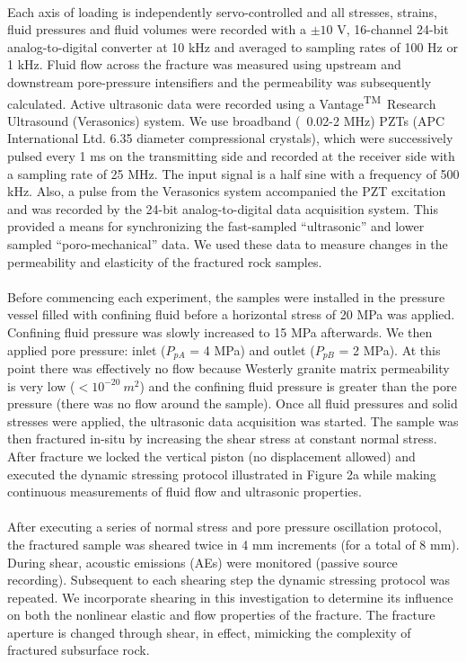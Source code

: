 \documentclass[letterpaper,10pt]{article}
\begin{document}
\paragraph{} Each axis of loading is independently servo-controlled and all stresses, strains, fluid pressures and fluid volumes were recorded with a $\pm10$ V, 16-channel 24-bit analog-to-digital converter at 10 kHz and averaged to sampling rates of 100 Hz or 1 kHz. Fluid flow across the fracture was measured using upstream and downstream pore-pressure intensifiers and the permeability was subsequently calculated. Active ultrasonic data were recorded using a Vantage\textsuperscript{TM}\ Research Ultrasound (Verasonics) system. We use broadband (~0.02-2 MHz) PZTs (APC International Ltd. 6.35 diameter compressional crystals), which were successively pulsed every 1 ms on the transmitting side and recorded at the receiver side with a sampling rate of 25 MHz. The input signal is a half sine with a frequency of 500 kHz. Also, a pulse from the Verasonics system accompanied the PZT excitation and was recorded by the 24-bit analog-to-digital data acquisition system. This provided a means for synchronizing the fast-sampled “ultrasonic” and lower sampled “poro-mechanical” data. We used these data to measure changes in the permeability and elasticity of the fractured rock samples.

\paragraph{} Before commencing each experiment, the samples were installed in the pressure vessel filled with confining fluid before a horizontal stress of 20 MPa was applied. Confining fluid pressure was slowly increased to 15 MPa afterwards. We then applied pore pressure: inlet ($P_{pA}$ = 4 MPa) and outlet ($P_{pB}$ = 2 MPa). At this point there was effectively no flow because Westerly granite matrix permeability is very low ($< 10^{-20}\ m^2$) and the confining fluid pressure is greater than the pore pressure (there was no flow around the sample). Once all fluid pressures and solid stresses were applied, the ultrasonic data acquisition was started. The sample was then fractured in-situ by increasing the shear stress at constant normal stress. After fracture we locked the vertical piston (no displacement allowed) and executed the dynamic stressing protocol illustrated in Figure 2a while making continuous measurements of fluid flow and ultrasonic properties.

\paragraph{} After executing a series of normal stress and pore pressure oscillation protocol, the fractured sample was sheared twice in 4 mm increments (for a total of 8 mm). During shear, acoustic emissions (AEs) were monitored (passive source recording). Subsequent to each shearing step the dynamic stressing protocol was repeated. We incorporate shearing in this investigation to determine its influence on both the nonlinear elastic and flow properties of the fracture. The fracture aperture is changed through shear, in effect, mimicking the complexity of fractured subsurface rock.
\end{document}
